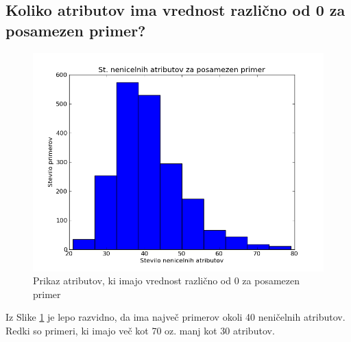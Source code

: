 \documentclass[a4paper,11pt]{article}
\begin{document}
\subsection*{Koliko atributov ima vrednost različno od 0 za posamezen primer?}
\begin{figure}[H]
\begin{center}
\includegraphics[scale=0.5]{examples.png}
\caption{Prikaz atributov, ki imajo vrednost različno od 0 za posamezen primer}
\label{primeri}
\end{center}
\end{figure}
Iz Slike \ref{primeri}  je lepo razvidno, da ima največ primerov okoli 40 neničelnih atributov. Redki so primeri, ki imajo več kot 70 oz. manj kot 30 atributov.
\end{document}
